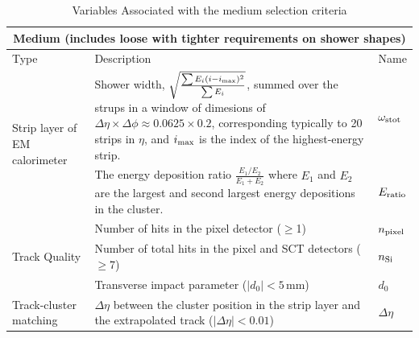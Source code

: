 \documentclass{article}
\begin{document}
\begin{table}[h!t]
\centering
\caption{ Variables Associated with the medium selection criteria \cite{ElectronPerformanceMeasurements}\label{table:mediumVariables}}
\begin{tabular}{|p{5cm}|p{8cm}|p{1cm}| } 
\hline
\multicolumn{3}{|c|}{\textbf{Medium (includes loose with tighter requirements on shower shapes)}} \\\hline
Type&Description&Name		    \\\hline
\multirow{2}{*}{Strip layer of EM calorimeter} & Shower width, $\sqrt{ \frac{\sum E_i (i-i_{\rm{max}})^2 } {\sum E_i} }$, summed over the strups in a window of dimesions of $\Delta\eta\times\Delta\phi\approx 0.0625\times0.2$, corresponding typically to 20 strips in $\eta$, and $i_{\rm{max}}$ is the index of the highest-energy strip. & $\omega_{\rm{stot}}$ \\\cline{2-3}
& The energy deposition ratio $\frac{E_1/E_2}{E_1+E_2}$ where $E_1$ and $E_2$ are the largest and second largest energy depositions in the cluster. & $E_{\rm{ratio}}$ \\\hline
\multirow{3}{*}{Track Quality} & Number of hits in the pixel detector ($\geq$1)&$n_{\rm{pixel}}$ \\\cline{2-3}
& Number of total hits in the pixel and SCT detectors ($\geq$7) & $n_{\rm{Si}}$ \\\cline{2-3}
& Transverse impact parameter ($|d_0|<5\,$mm) & $d_0$ \\\hline
Track-cluster matching & $\Delta\eta$ between the cluster position in the strip layer and the extrapolated track ($|\Delta\eta|<0.01$) & $\Delta\eta$\\\hline
\end{tabular}
\end{table}
\end{document}
